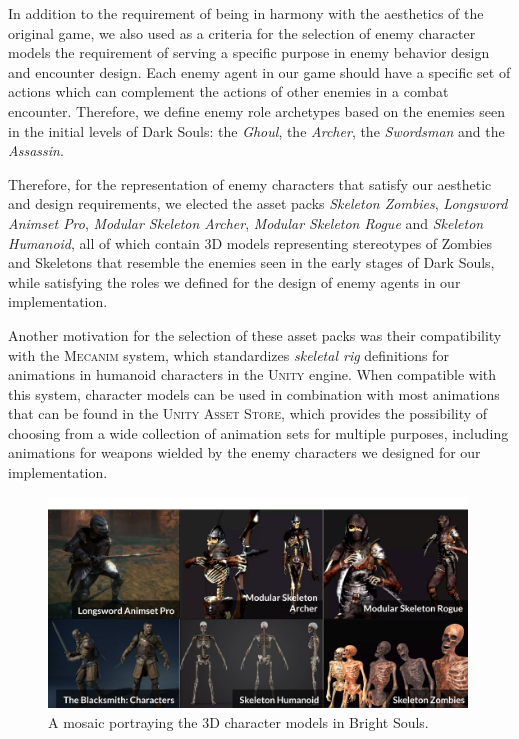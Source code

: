 In addition to the requirement of being in harmony with the aesthetics of the original game, we also used as a criteria for the selection of enemy character models the requirement of serving a specific purpose in enemy behavior design and encounter design. Each enemy agent in our game should have a specific set of actions which can complement the actions of other enemies in a combat encounter. Therefore, we define enemy role archetypes based on the enemies seen in the initial levels of Dark Souls: the \emph{Ghoul}, the \emph{Archer}, the \emph{Swordsman} and the \emph{Assassin}.

Therefore, for the representation of enemy characters that satisfy our aesthetic and design requirements, we elected the asset packs \emph{Skeleton Zombies}, \emph{Longsword Animset Pro}, \emph{Modular Skeleton Archer}, \emph{Modular Skeleton Rogue} and \emph{Skeleton Humanoid}, all of which contain 3D models representing stereotypes of Zombies and Skeletons that resemble the enemies seen in the early stages of Dark Souls, while satisfying the roles we defined for the design of enemy agents in our implementation.

Another motivation for the selection of these asset packs was their compatibility with the \textsc{Mecanim} system, which standardizes \emph{skeletal rig} definitions for animations in humanoid characters in the \textsc{Unity} engine. When compatible with this system, character models can be used in combination with most animations that can be found in the \textsc{Unity Asset Store}, which provides the possibility of choosing from a wide collection of animation sets for multiple purposes, including animations for weapons wielded by the enemy characters we designed for our implementation.

\begin{figure}
    \caption{A mosaic portraying the 3D character models in Bright Souls.}
    \begin{center}
        \includegraphics[width=30em]{figures/fig-character-assets.png}
    \end{center}
    \label{fig:character-assets}
\end{figure}

